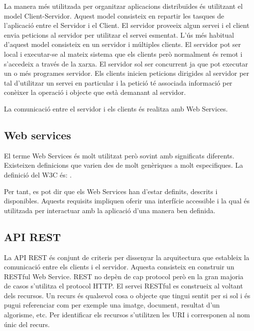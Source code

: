 \documentclass[12pt, titlepage]{article}
\begin{document}
La manera més utilitzada per organitzar aplicacions distribuïdes és utilitzant
el model Client-Servidor. Aquest model consisteix en repartir les tasques de
l’aplicació entre el Servidor i el Client. El servidor proveeix algun servei i
el client envia peticions al servidor per utilitzar el servei esmentat. L’ús més
habitual d’aquest model consisteix en un servidor i múltiples clients.
El servidor pot ser local i executar-se al mateix sistema que els clients però
normalment és remot i s’accedeix a través de la xarxa. El servidor sol ser
concurrent ja que pot executar un o més programes servidor.
Els clients inicien peticions dirigides al servidor per tal d’utilitzar un
servei en particular i la petició té associada informació per conèixer la
operació i objecte que està demanant al servidor.

La comunicació entre el servidor i els clients és realitza amb Web Services.

\subsection{Web services}
El terme Web Services és molt utilitzat però sovint amb significats diferents.
Existeixen definicions que varien des de molt genèriques a molt especifiques. La
definició del W3C és:
.

Per tant,
es pot dir que els Web Services han d’estar definits, descrits i disponibles.
Aquests requisits impliquen oferir una interfície accessible i la qual és utilitzada
per interactuar amb la aplicació d’una manera ben definida.

\subsection{API REST}

La API REST és  conjunt de criteris per dissenyar la arquitectura que estableix
la comunicació entre els clients i el servidor. Aquesta consisteix en construir
un RESTful Web Service. REST no depèn de cap protocol però en la gran majoria
de casos s'utilitza el protocol HTTP. El servei RESTful es construeix al voltant
dels recursos. Un recurs és qualsevol cosa o objecte que tingui sentit per si
sol i és pugui referenciar com per exemple una imatge, document, resultat d’un
algorisme, etc. Per identificar els recursos s’utilitzen les URI i corresponen al nom
únic del recurs.
\end{document}
